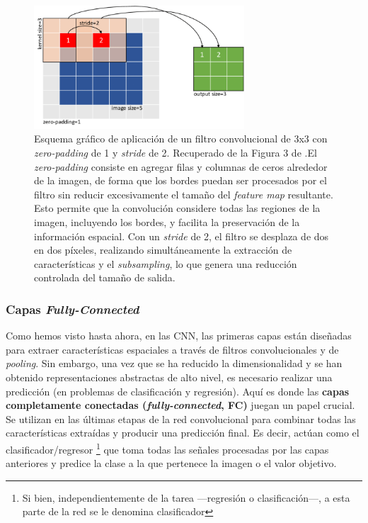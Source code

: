 \begin{figure}[htbp]
    \centering
    \includegraphics[width=0.7\textwidth]{capitulos/cap_02/imagenes/Example-of-a-square-image-convolution-with-zero-padding-While-training-a-CNN-there-are.png}
    \caption[
        Esquema gráfico de aplicación de un filtro convolucional de 3x3 con \textit{zero-padding} de 1 y \textit{stride} de 2.
    ]{
        Esquema gráfico de aplicación de un filtro convolucional de 3x3 con \textit{zero-padding} de 1 y \textit{stride} de 2.
        Recuperado de la Figura 3 de \cite{kiourt2020deep}.El \textit{zero-padding} consiste en agregar filas y columnas de ceros alrededor de la imagen, de forma que los bordes puedan ser procesados por el filtro sin reducir excesivamente el tamaño del \textit{feature map} resultante. Esto permite que la convolución considere todas las regiones de la imagen, incluyendo los bordes, y facilita la preservación de la información espacial. Con un \textit{stride} de 2, el filtro se desplaza de dos en dos píxeles, realizando simultáneamente la extracción de características y el \textit{subsampling}, lo que genera una reducción controlada del tamaño de salida.
    } 
    \label{fig:stride_example}
\end{figure}


\subsubsection{Capas \textit{Fully-Connected}}

Como hemos visto hasta ahora, en las \acrshort{CNN}, las primeras capas están diseñadas para extraer características espaciales a través de filtros convolucionales y de \textit{pooling}. Sin embargo, una vez que se ha reducido la dimensionalidad y se han obtenido representaciones abstractas de alto nivel, es necesario realizar una predicción (en problemas de clasificación y regresión). Aquí es donde las \textbf{capas completamente conectadas (\textit{fully-connected}, \acrshort{FC})} juegan un papel crucial. Se utilizan en las últimas etapas de la red convolucional para combinar todas las características extraídas y producir una predicción final. Es decir, actúan como el clasificador/regresor%
\footnote{
    Si bien, independientemente de la tarea ---regresión o clasificación---, a esta parte de la red se le 
    denomina clasificador
} 
que toma todas las señales procesadas por las capas anteriores y predice la clase a la que pertenece la imagen o el valor objetivo. 

